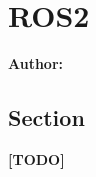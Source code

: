 \chapter{ROS2}

\textbf{Author: } 

\section{Section}
\textbf{[TODO]}
\newline
\lipsum[1]

\filbreak